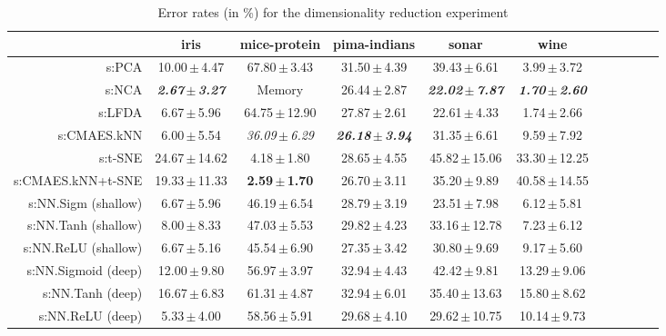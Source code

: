 \begin{table}[ht]
{\begin{tabular}{rcccccccccc}
\midrule
& \multicolumn{1}{c}{iris} & \multicolumn{1}{c}{mice-protein} & \multicolumn{1}{c}{pima-indians} & \multicolumn{1}{c}{sonar} & \multicolumn{1}{c}{wine} \\ 
\midrule
s:PCA & 10.00\,$\pm$\,4.47 & 67.80\,$\pm$\,3.43 & 31.50\,$\pm$\,4.39 & 39.43\,$\pm$\,6.61 & 3.99\,$\pm$\,3.72 \\
s:NCA & \emph{\textbf{2.67\,$\pm$\,3.27}} & Memory  & 26.44\,$\pm$\,2.87 & \emph{\textbf{22.02\,$\pm$\,7.87}} & \emph{\textbf{1.70\,$\pm$\,2.60}} \\
s:LFDA & 6.67\,$\pm$\,5.96 & 64.75\,$\pm$\,12.90 & 27.87\,$\pm$\,2.61 & 22.61\,$\pm$\,4.33 & 1.74\,$\pm$\,2.66 \\
s:CMAES.kNN & 6.00\,$\pm$\,5.54 & \emph{36.09\,$\pm$\,6.29} & \emph{\textbf{26.18\,$\pm$\,3.94}} & 31.35\,$\pm$\,6.61 & 9.59\,$\pm$\,7.92 \\
s:t-SNE & 24.67\,$\pm$\,14.62 & 4.18\,$\pm$\,1.80 & 28.65\,$\pm$\,4.55 & 45.82\,$\pm$\,15.06 & 33.30\,$\pm$\,12.25 \\
s:CMAES.kNN+t-SNE & 19.33\,$\pm$\,11.33 & \textbf{2.59\,$\pm$\,1.70} & 26.70\,$\pm$\,3.11 & 35.20\,$\pm$\,9.89 & 40.58\,$\pm$\,14.55 \\
s:NN.Sigm (shallow) & 6.67\,$\pm$\,5.96 & 46.19\,$\pm$\,6.54 & 28.79\,$\pm$\,3.19 & 23.51\,$\pm$\,7.98 & 6.12\,$\pm$\,5.81 \\
s:NN.Tanh (shallow) & 8.00\,$\pm$\,8.33 & 47.03\,$\pm$\,5.53 & 29.82\,$\pm$\,4.23 & 33.16\,$\pm$\,12.78 & 7.23\,$\pm$\,6.12 \\
s:NN.ReLU (shallow) & 6.67\,$\pm$\,5.16 & 45.54\,$\pm$\,6.90 & 27.35\,$\pm$\,3.42 & 30.80\,$\pm$\,9.69 & 9.17\,$\pm$\,5.60 \\
s:NN.Sigmoid (deep) & 12.00\,$\pm$\,9.80 & 56.97\,$\pm$\,3.97 & 32.94\,$\pm$\,4.43 & 42.42\,$\pm$\,9.81 & 13.29\,$\pm$\,9.06 \\
s:NN.Tanh (deep) & 16.67\,$\pm$\,6.83 & 61.31\,$\pm$\,4.87 & 32.94\,$\pm$\,6.01 & 35.40\,$\pm$\,13.63 & 15.80\,$\pm$\,8.62 \\
s:NN.ReLU (deep) & 5.33\,$\pm$\,4.00 & 58.56\,$\pm$\,5.91 & 29.68\,$\pm$\,4.10 & 29.62\,$\pm$\,10.75 & 10.14\,$\pm$\,9.73 \\


\bottomrule
\end{tabular}
}
\caption{Error rates (in \%) for the dimensionality reduction experiment} \label{tab:dim-error-rates}
\end{table}

